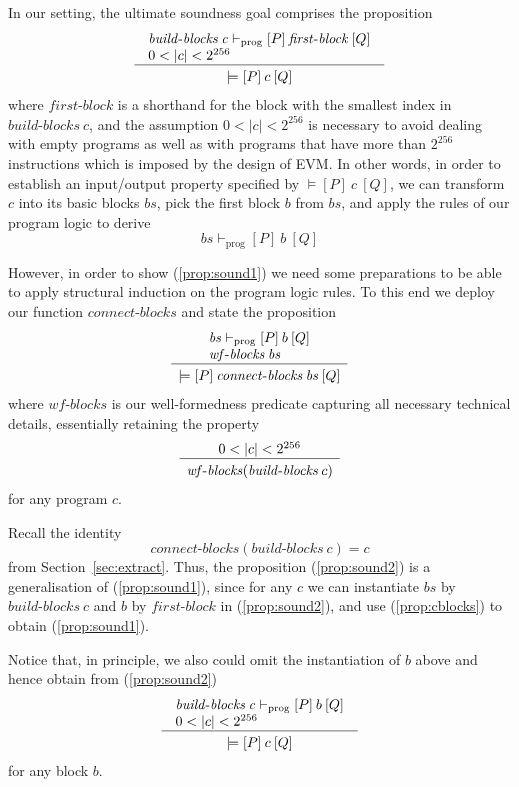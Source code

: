 \documentclass[sigplan,10pt,review]{acmart}\settopmatter{printfolios=true,printccs=false,printacmref=false}
\newcommand{\tvalid}[3]{\models[#1]\:#2\:[#3]}
\newcommand{\ttrip}[5]{\mathit{#1} \vdash_{\mathrm{#2}}[#3]\:#4\:[#5]}
\newcommand{\RuleC}[2]{\begin{array}{c}#1\\\hline\noalign{\smallskip}#2\end{array}}
\newcommand{\bblocks}{\mathit{build\mbox{-}blocks}}
\newcommand{\cblocks}{\mathit{connect\mbox{-}blocks}}
\newcommand{\fblock}{\mathit{first\mbox{-}block}}
\newcommand{\len}[1]{|#1|}
\newcommand{\wfblocks}{\mathit{wf\mbox{-}blocks}}
\begin{document}
In our setting, the ultimate soundness goal comprises the proposition
\begin{equation}
\label{prop:sound1}
\RuleC{\begin{array}{l}
       \ttrip{\bblocks\: c}{prog}{P}{\fblock}{Q} \\
       0 < \len{c} < 2^{256} 
       \end{array}}
{\tvalid{P}{c}{Q}}
\end{equation}
where $\fblock$ is a shorthand for the block with the smallest index in $\bblocks\: c$, and
the assumption $0 < \len{c} < 2^{256}$ is necessary to avoid dealing with empty programs
as well as with programs that have more than $2^{256}$ instructions which is imposed by 
the design of EVM. In other words, in order to establish an input/output property specified by 
$\tvalid{P}{c}{Q}$, we can transform $c$ into its basic blocks $\mathit{bs}$, 
pick the first block $b$ from $\mathit{bs}$, and
apply the rules of our program logic to derive 
\[
\ttrip{\mathit{bs}}{prog}{P}{b}{Q}
\]

However, in order to show (\ref{prop:sound1}) we need some preparations to be able to apply
structural induction on the program logic rules. To this end we deploy our function $\cblocks$
and state the proposition
\begin{equation}
\label{prop:sound2}
\RuleC{\begin{array}{l}
       \ttrip{\mathit{bs}}{prog}{P}{b}{Q} \\
       \wfblocks\:\mathit{bs}
       \end{array}}
{\tvalid{P}{\cblocks \: \mathit{bs}}{Q}}
\end{equation}
where $\wfblocks$ is our well-formedness predicate capturing all necessary technical details,
essentially retaining the property 
\[
\RuleC{0 < \len{c} < 2^{256}}
{\wfblocks(\bblocks \: c)}
\] 
for any program $c$. 

Recall the identity 
\begin{equation}
\label{prop:cblocks}
\cblocks(\bblocks\:c) = c
\end{equation} 
from Section~\ref{sec:extract}.
Thus, the proposition (\ref{prop:sound2}) is a generalisation of
(\ref{prop:sound1}), since for any $c$ we can instantiate $\mathit{bs}$ by $\bblocks \: c$ 
and $b$ by $\fblock$ in (\ref{prop:sound2}), and use (\ref{prop:cblocks}) to obtain
(\ref{prop:sound1}). 

Notice that, in principle, we also could omit the instantiation of $b$ above
and hence obtain from (\ref{prop:sound2})
\[
\RuleC{\begin{array}{l}
       \ttrip{\bblocks\: c}{prog}{P}{b}{Q} \\
       0 < \len{c} < 2^{256} 
       \end{array}}
{\tvalid{P}{c}{Q}}
\]
for any block $b$. 
\end{document}

